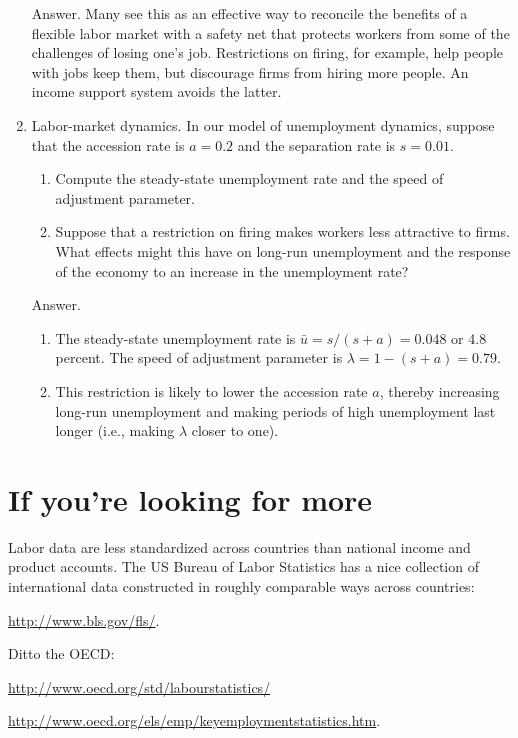 \begin{enumerate}
Answer.  Many see this as an effective way to
reconcile the benefits of a flexible labor market
with a safety net that protects workers from some
of the challenges of losing one's job.
Restrictions on firing, for example, help people with jobs keep them,
but discourage firms from hiring more people.
An income support system avoids the latter.


\item Labor-market dynamics.
In our model of unemployment dynamics, suppose that the accession rate
 is
$a = 0.2$ and the separation rate is $s = 0.01$.
\begin{enumerate}
\item Compute the steady-state unemployment rate and the speed
of adjustment parameter.
\item Suppose that a restriction on firing makes workers less attractive to firms.
What effects might this have on long-run unemployment
and the response of the economy to an increase in the unemployment rate?
\end{enumerate}

Answer.
\begin{enumerate}
\item The steady-state unemployment rate is $\bar{u} = s/(s+a) = 0.048$
or 4.8 percent.
The speed of adjustment
 parameter is $\lambda = 1-(s+a) = 0.79$.
\item This restriction is likely to lower the accession rate
 $a$,
thereby increasing long-run unemployment and making periods of high unemployment
last longer (i.e., making $\lambda$ closer to one).
\end{enumerate}
\end{enumerate}
\setlength{\leftmargini}{\oldleftmargini}


\section*{If you're looking for more}

Labor data are less standardized across countries than national
income and product accounts.
The US Bureau of Labor Statistics has a nice collection
of international data constructed in roughly comparable ways across countries:

\vspace*{\parskip}
\centerline{\url{http://www.bls.gov/fls/}.}

Ditto the {OECD}:

\vspace*{\parskip}
\centerline{\url{http://www.oecd.org/std/labourstatistics/}}
\centerline{\url{http://www.oecd.org/els/emp/keyemploymentstatistics.htm}.}

